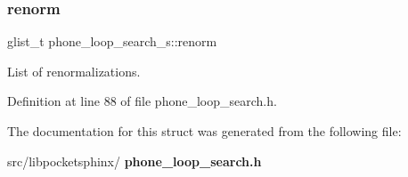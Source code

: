 \mbox{\label{structphone__loop__search__s_a273295fbe1a22ad3ddf7db8695a394ec}} 
\subsubsection{renorm}
{\footnotesize\ttfamily glist\+\_\+t phone\+\_\+loop\+\_\+search\+\_\+s\+::renorm}



List of renormalizations. 



Definition at line 88 of file phone\+\_\+loop\+\_\+search.\+h.



The documentation for this struct was generated from the following file\+:\begin{DoxyCompactItemize}
\item 
src/libpocketsphinx/\textbf{ phone\+\_\+loop\+\_\+search.\+h}\end{DoxyCompactItemize}
